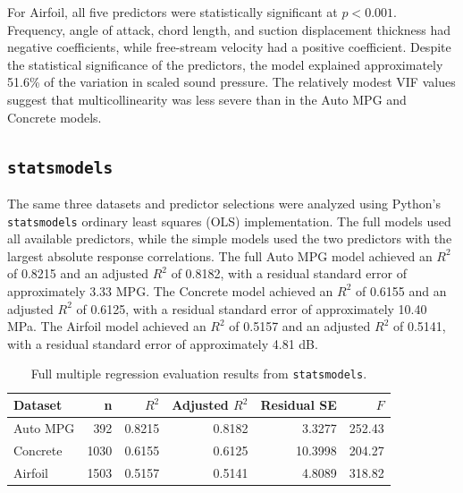 \documentclass{article}
\begin{document}
For Airfoil, all five predictors were statistically significant at $p<0.001$. Frequency, angle of attack, chord length, and suction displacement thickness had negative coefficients, while free-stream velocity had a positive coefficient. Despite the statistical significance of the predictors, the model explained approximately 51.6\% of the variation in scaled sound pressure. The relatively modest VIF values suggest that multicollinearity was less severe than in the Auto MPG and Concrete models.





\subsection{\texttt{statsmodels}}

The same three datasets and predictor selections were analyzed using Python's \texttt{statsmodels} ordinary least squares (OLS) implementation. The full models used all available predictors, while the simple models used the two predictors with the largest absolute response correlations. The full Auto MPG model achieved an $R^2$ of 0.8215 and an adjusted $R^2$ of 0.8182, with a residual standard error of approximately 3.33 MPG. The Concrete model achieved an $R^2$ of 0.6155 and an adjusted $R^2$ of 0.6125, with a residual standard error of approximately 10.40 MPa. The Airfoil model achieved an $R^2$ of 0.5157 and an adjusted $R^2$ of 0.5141, with a residual standard error of approximately 4.81 dB.

\begin{table}[H]
\centering
\caption{Full multiple regression evaluation results from \texttt{statsmodels}.}
\label{tab:full-regression-results}
\begin{tabular}{lrrrrr}
\hline
Dataset & n & $R^2$ & Adjusted $R^2$ & Residual SE & $F$ \\
\hline
Auto MPG & 392  & 0.8215 & 0.8182 & 3.3277  & 252.43 \\
Concrete & 1030 & 0.6155 & 0.6125 & 10.3998 & 204.27 \\
Airfoil  & 1503 & 0.5157 & 0.5141 & 4.8089  & 318.82 \\
\hline
\end{tabular}
\end{table}
\end{document}
